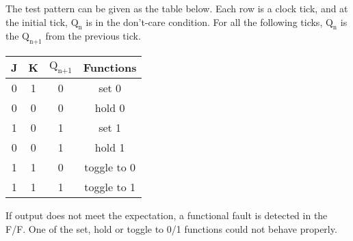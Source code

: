 The test pattern can be given as the table below. Each row is a clock tick, and at the initial tick, $\text{Q}_\text{n}$ is in the don't-care condition. For all the following ticks, $\text{Q}_\text{n}$ is the $\text{Q}_\text{n+1}$ from the previous tick.
\begin{center}
  \begin{tabular}{c c | c | c}
    J & K & $\text{Q}_\text{n+1}$ & Functions \\
    \hline
    0 & 1 & 0 & set 0 \\
    0 & 0 & 0 & hold 0 \\
    1 & 0 & 1 & set 1 \\
    0 & 0 & 1 & hold 1 \\
    1 & 1 & 0 & toggle to 0 \\
    1 & 1 & 1 & toggle to 1 \\
  \end{tabular}
\end{center}
If output does not meet the expectation, a functional fault is detected in the F/F. One of the set, hold or toggle to 0/1 functions could not behave properly.
